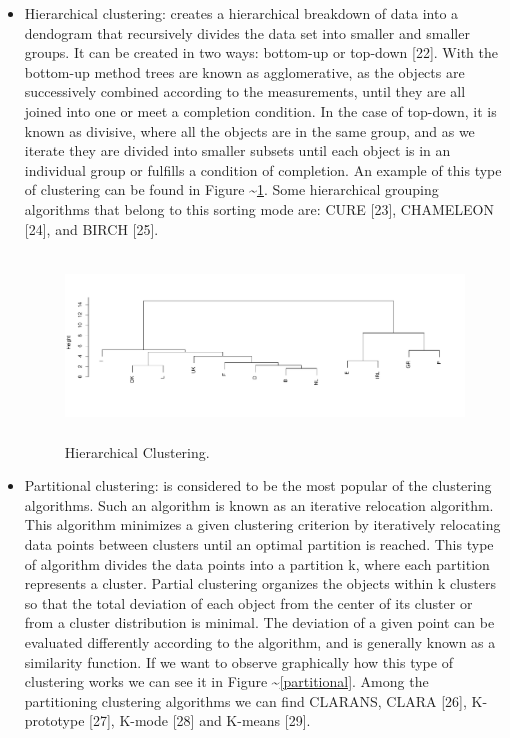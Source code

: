 \documentclass[
]{article}
\begin{document}
\begin{itemize}
\item
  Hierarchical clustering: creates a hierarchical breakdown of data into
  a dendogram that recursively divides the data set into smaller and
  smaller groups. It can be created in two ways: bottom-up or top-down
  {[}22{]}. With the bottom-up method trees are known as agglomerative,
  as the objects are successively combined according to the
  measurements, until they are all joined into one or meet a completion
  condition. In the case of top-down, it is known as divisive, where all
  the objects are in the same group, and as we iterate they are divided
  into smaller subsets until each object is in an individual group or
  fulfills a condition of completion. An example of this type of
  clustering can be found in Figure \textasciitilde{}\ref{hierarchical}.
  Some hierarchical grouping algorithms that belong to this sorting mode
  are: CURE {[}23{]}, CHAMELEON {[}24{]}, and BIRCH {[}25{]}.\\
  \newpage

  \begin{figure}
  \centering
  \includegraphics[width=\textwidth,height=1.92708in]{img/hierarchical.pdf}
  \caption{Hierarchical Clustering. \label{hierarchical}}
  \end{figure}
\item
  Partitional clustering: is considered to be the most popular of the
  clustering algorithms. Such an algorithm is known as an iterative
  relocation algorithm. This algorithm minimizes a given clustering
  criterion by iteratively relocating data points between clusters until
  an optimal partition is reached. This type of algorithm divides the
  data points into a partition k, where each partition represents a
  cluster. Partial clustering organizes the objects within k clusters so
  that the total deviation of each object from the center of its cluster
  or from a cluster distribution is minimal. The deviation of a given
  point can be evaluated differently according to the algorithm, and is
  generally known as a similarity function. If we want to observe
  graphically how this type of clustering works we can see it in Figure
  \textasciitilde{}\ref{partitional}. Among the partitioning clustering
  algorithms we can find CLARANS, CLARA {[}26{]}, K-prototype {[}27{]},
  K-mode {[}28{]} and K-means {[}29{]}.


\end{itemize}
\end{document}
